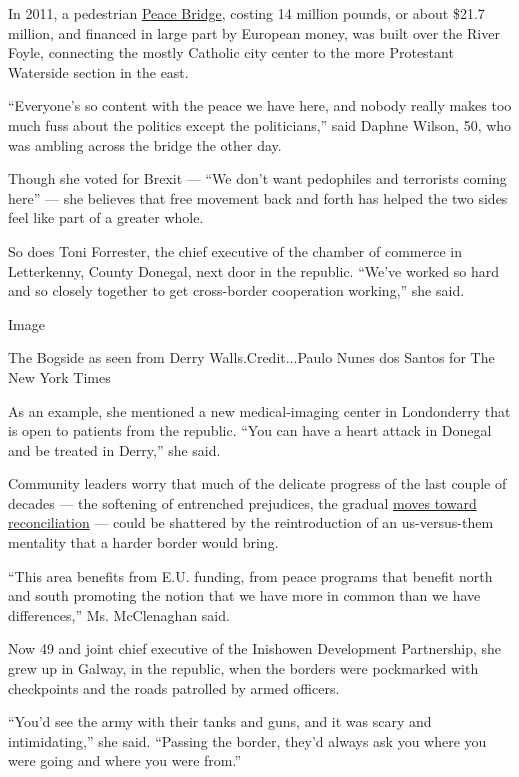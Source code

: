 In 2011, a pedestrian
\href{http://www.irelands-hidden-gems.com/derry-peace-bridge.html}{Peace
Bridge}, costing 14 million pounds, or about \$21.7 million, and
financed in large part by European money, was built over the River
Foyle, connecting the mostly Catholic city center to the more Protestant
Waterside section in the east.

``Everyone's so content with the peace we have here, and nobody really
makes too much fuss about the politics except the politicians,'' said
Daphne Wilson, 50, who was ambling across the bridge the other day.

Though she voted for Brexit --- ``We don't want pedophiles and
terrorists coming here'' --- she believes that free movement back and
forth has helped the two sides feel like part of a greater whole.

So does Toni Forrester, the chief executive of the chamber of commerce
in Letterkenny, County Donegal, next door in the republic. ``We've
worked so hard and so closely together to get cross-border cooperation
working,'' she said.

Image

The Bogside as seen from Derry Walls.Credit...Paulo Nunes dos Santos for
The New York Times

As an example, she mentioned a new medical-imaging center in Londonderry
that is open to patients from the republic. ``You can have a heart
attack in Donegal and be treated in Derry,'' she said.

Community leaders worry that much of the delicate progress of the last
couple of decades --- the softening of entrenched prejudices, the
gradual
\href{https://www.nytimes.com/2015/03/28/world/europe/using-flames-to-soothe-a-northern-ireland-city-scarred-by-fire.html}{moves
toward reconciliation} --- could be shattered by the reintroduction of
an us-versus-them mentality that a harder border would bring.

``This area benefits from E.U. funding, from peace programs that benefit
north and south promoting the notion that we have more in common than we
have differences,'' Ms. McClenaghan said.

Now 49 and joint chief executive of the Inishowen Development
Partnership, she grew up in Galway, in the republic, when the borders
were pockmarked with checkpoints and the roads patrolled by armed
officers.

``You'd see the army with their tanks and guns, and it was scary and
intimidating,'' she said. ``Passing the border, they'd always ask you
where you were going and where you were from.''

